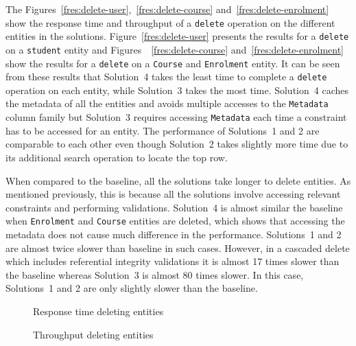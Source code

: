 The Figures~\ref{fres:delete-user},~\ref{fres:delete-course}
and~\ref{fres:delete-enrolment} show the response time and throughput of a
\texttt{delete} operation on the different entities in the solutions.
Figure~\ref{fres:delete-user} presents the results for a \texttt{delete} on a
\texttt{student} entity and Figures~~\ref{fres:delete-course}
and~\ref{fres:delete-enrolment} show the results for a \texttt{delete} on a
\texttt{Course} and \texttt{Enrolment} entity. It can be seen from these results
that Solution~4 takes the least time to complete a \texttt{delete} operation on
each entity, while Solution~3 takes the most time. Solution~4 caches the
metadata of all the entities and avoids multiple accesses to the
\texttt{Metadata} column family but Solution~3 requires accessing
\texttt{Metadata} each time a constraint has to be accessed for an entity. The
performance of Solutions~1 and 2 are comparable to each other even though
Solution~2 takes slightly more time due to its additional search operation to
locate the top row.

When compared to the baseline, all the solutions take longer to delete entities.
As mentioned previously, this is because all the solutions involve accessing
relevant constraints and performing validations. Solution~4 is almost similar
the baseline when \texttt{Enrolment} and \texttt{Course} entities are deleted,
which shows that accessing the metadata does not cause much difference in the
performance. Solutions~1 and 2 are almost twice slower than baseline in such
cases. However, in a cascaded delete which includes referential integrity
validations it is almost 17 times slower than the baseline whereas Solution~3 is
almost 80 times slower. In this case, Solutions~1 and 2 are only slightly slower
than the baseline.



\begin{landscape}
		\begin{figure}
		\centering
		\newcommand{\W}{.4\textwidth}
			\caption{Response time deleting entities}\label{fres:delete-response-time}
						
			\caption{Throughput deleting entities}\label{fres:delete-throughput}
		\end{figure}
\end{landscape}		
